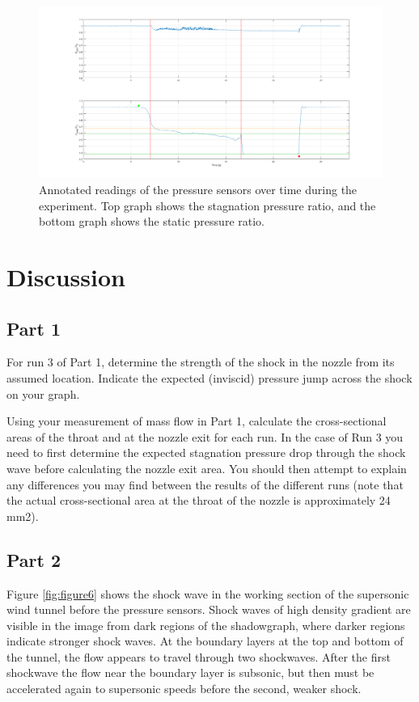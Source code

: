 \documentclass{article}
\begin{document}
\begin{figure}[H]
    \centering
    \includegraphics[width=1\textwidth]{../Supersonic_Nozzle/tunnel_pressures_annotated.png}
    \caption{Annotated readings of the pressure sensors over time during the experiment. Top graph shows the stagnation pressure ratio, and the bottom graph shows the static pressure ratio.}
    \label{fig:figure8}
\end{figure}

\section{Discussion}

\subsection{Part 1}

For run 3 of Part 1, determine the strength of the shock in the nozzle from its assumed location.
Indicate the expected (inviscid) pressure jump across the shock on your graph.

Using your measurement of mass flow in Part 1, calculate the cross-sectional areas of the throat and at
the nozzle exit for each run. In the case of Run 3 you need to first determine the expected stagnation
pressure drop through the shock wave before calculating the nozzle exit area. You should then attempt
to explain any differences you may find between the results of the different runs (note that the actual
cross-sectional area at the throat of the nozzle is approximately 24 mm2).

\subsection{Part 2}

Figure \ref{fig:figure6} shows the shock wave in the working section of the supersonic wind tunnel before the pressure sensors.
Shock waves of high density gradient are visible in the image from dark regions of the shadowgraph, where darker regions indicate stronger shock waves.
At the boundary layers at the top and bottom of the tunnel, the flow appears to travel through two shockwaves.
After the first shockwave the flow near the boundary layer is subsonic, but then must be accelerated again to supersonic speeds before the second, weaker shock.
\end{document}
